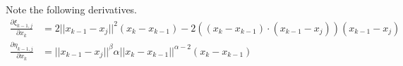 \documentclass[a4paper, 11pt]{article}
\newcommand{\norm}[1]{||#1||}
\theoremstyle{definition}
\theoremstyle{remark}
\begin{document}
Note the following derivatives.
\begin{align}
    \frac{\partial \xi_{k-1,j}}{\partial x_k} &= 2 \norm{x_{k-1} - x_j}^2 (x_k - x_{k-1}) - 2 \left( \left( x_k - x_{k-1} \right) \cdot \left( x_{k-1} - x_j \right) \right) (x_{k-1} -x_j) \\
    \frac{\partial \eta_{k-1,j}}{\partial x_k} &= \norm{x_{k-1} - x_j}^{\beta} \alpha \norm{x_{k} - x_{k-1}}^{\alpha - 2} (x_{k} - x_{k-1})
\end{align}
\end{document}
